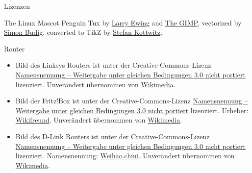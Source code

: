 \documentclass[t]{beamer}
\begin{document}

\begin{frame}{Lizenzen}
    \begin{block}{The Linux Mascot}
        Penguin Tux by \href{mailto:lewing@isc.tamu.edu}{Larry Ewing}
        and \href{http://isc.tamu.edu/~lewing/linux/}{The GIMP},
        vectorized by \href{http://www.home.unix-ag.org/simon/}{Simon Budig},
        converted to TikZ by
        \href{http://www.texample.net/weblog/2012/apr/28/tux-tex-tikz/}{Stefan Kottwitz}.
    \end{block}
    \begin{block}{Router}
        \small
        \begin{itemize}
            \item Bild des Linksys Routers ist unter der
                Creative-Commons-Lizenz
                \href{https://creativecommons.org/licenses/by-sa/3.0/deed.de}{Namensnennung
                – Weitergabe unter gleichen Bedingungen 3.0 nicht portiert}
                lizenziert. Unverändert übernommen von
                \href{https://commons.wikimedia.org/wiki/File:Linksys_BEFSR41_Router_20040321.jpg}{Wikimedia}.
            \item Bild der Fritz!Box ist unter der Creative-Commons-Lizenz
                \href{https://creativecommons.org/licenses/by-sa/3.0/deed.de}{Namensnennung
                – Weitergabe unter gleichen Bedingungen 3.0 nicht portiert}
                lizenziert. Urheber:
                \href{https://commons.wikimedia.org/wiki/User:Wikifreund}{Wikifreund}.
                Unverändert übernommen von
                \href{https://commons.wikimedia.org/wiki/File:FRITZ!Box_6490_Cable.JPG}{Wikimedia}.
            \item Bild des D-Link Routers ist unter der Creative-Commons-Lizenz
                \href{https://creativecommons.org/licenses/by-sa/3.0/deed.de}{Namensnennung
                – Weitergabe unter gleichen Bedingungen 3.0 nicht portiert}
                lizenziert. Namensnennung:
                \href{https://zh.wikipedia.org/wiki/User:Weihao.chiu}{Weihao.chiui}.
                Unverändert übernommen von
                \href{https://commons.wikimedia.org/wiki/File:D-Link_DI-524.jpg}{Wikimedia}.
        \end{itemize}
        \normalsize
    \end{block}
\end{frame}
\end{document}

